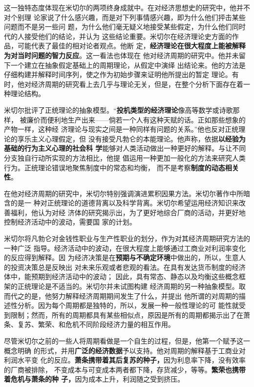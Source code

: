这一独特态度体现在米切尔的两项终身成就中。在对经济思想史的研究中，他并不对个别理
论家说了什么感兴趣，而是对下列事情感兴趣，即为什么他们抨击某些问题而不是另一些问
题，为什么他们毫无疑义地接受某些假定，为什么他们同时代的人接受他们的结论，并认为
这些结论重要。米切尔在经济理论史方面的作品，可能代表了最佳的相对论者观点。他断
定，\textbf{经济理论在很大程度上能被解释为对当时问题的智力反应}。这一看法也体现在
他对经济周期的研究中。他并未留下一个建立在抽象假定基础上的周期理论，从假定中演绎
出结论来。他的方法是仔细构建并解释时间序列，使之作为初始步骤来证明他所提出的暂定
理论。有时，他对经济周期的研究看上去几乎与理论无关，但是，在整个分析下面存在着一
种理论结构。

米切尔批评了正统理论的抽象模型。“\textbf{投机类型的经济理论}像高等数学或诗歌那样，
被廉价而便利地生产出来——倘若一个人有这种天赋的话。正如那些想象的产物一样，这种经
济理论与现实之间是一种同样有问题的关系。”他也反对正统理论的享乐主义心理假定，但
没有接受凡勃仑的本能理论。他声称，依据\textbf{以经验为基础的行为主义心理的社会科
  学}能够对人类活动做出一种更好的解释。与让不同分支独自行动所实现的方法相比，他提
倡运用一种更加一般化的方法来研究人类行为。正统理论错误地聚焦制度中的常态和均衡，
而不是考察\textbf{制度的动态相关性}。

在他对经济周期的研究中，米切尔特别强调演进累积因果方法。米切尔著作中所暗含的是一
种对正统理论的道德背离以及科学背离。米切尔希望运用经济知识来改善福利，他认为对经
济体的研究揭示出，为了更好地综合厂商的活动，并更好地控制经济活动中的波动，需要国
家的计划。

米切尔将凡勃仑对金钱性职业与生产性职业的划分，作为对其经济周期研究方法的一种广泛
指导。经济活动中的波动，在很大程度上能够通过工商业对利润率变化的反应得到解释。因
为经济决策是在\textbf{预期与不确定环境}中做出的，所以，生意人的投资决策总是反映出
对未来乐观或者悲观的看法。在具有发达货币制度的经济体中，能预期到经济活动中的波动；
因此，具有常态、静态以及均衡这些概念框架的正统理论是不适当的。米切尔并未试图构建
经济周期的另一种抽象模型。取而代之的是，他努力解释经济周期期间发生了什么，并提出
他所谓的对周期的描述性分析。因为每个周期都是独特的，所以，发展一种一般性理论的可
能性就受到限制；然而，所有的周期都具有某些相似点，原因是所有的周期都揭示出了在萧
条、复苏、繁荣、和危机不同阶段经济力量的相互作用。

尽管米切尔之前的一些人将周期看做是一个自生的过程，但是，他第一个赋予这一概念明确
的形式，并用\textbf{广泛的经济数据}予以支持。他对周期的解释基于工商业对利润水平变
化的反应。\textbf{萧条携带着其后复苏的种子，}因为利息率下降，没有效率的厂商被排除，
不变成本与可变成本两者都下降，存货减少，等等。\textbf{繁荣也携带着危机与萧条的种
  子，}因为成本上升，利润随之受到挤压。

